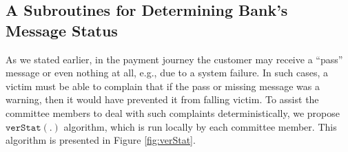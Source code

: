 
\vspace{-2mm}
\subsection{A Subroutines for Determining Bank's Message Status}

As we stated earlier, in the payment journey the customer may receive a ``pass'' message or even nothing at all, e.g., due to a system failure. In such cases,  a victim  must be able to complain that if the pass or missing message was   a warning, then it   would have prevented it  from falling victim. To assist the committee members to deal with  such complaints deterministically, we propose    $\mathtt{verStat}(.)$ algorithm, which is run locally by each committee member. This algorithm is presented in Figure \ref{fig:verStat}. 


